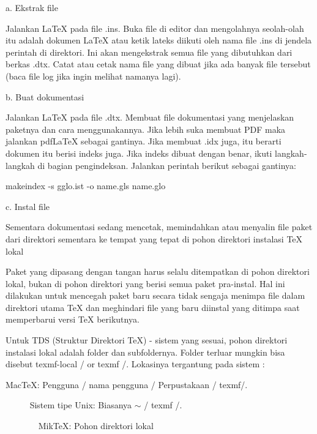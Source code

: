 \noindent a. Ekstrak file\par
Jalankan LaTeX pada file .ins. Buka file di editor dan mengolahnya seolah-olah itu adalah dokumen LaTeX atau ketik lateks diikuti oleh nama file .ins di jendela perintah di direktori. Ini akan mengekstrak semua file yang dibutuhkan dari berkas .dtx. Catat atau cetak nama file yang dibuat jika ada banyak file tersebut (baca file log jika ingin melihat namanya lagi). \par

\vspace{8pt}
\noindent b. Buat dokumentasi \par
Jalankan LaTeX pada file .dtx. Membuat file dokumentasi yang menjelaskan paketnya dan cara menggunakannya. Jika lebih suka membuat PDF maka jalankan pdfLaTeX sebagai gantinya. Jika membuat .idx juga, itu berarti dokumen itu berisi indeks juga. Jika indeks dibuat dengan benar, ikuti langkah-langkah di bagian pengindeksan. Jalankan perintah berikut sebagai gantinya: \par

makeindex -s gglo.ist -o name.gls name.glo \par

\vspace{40pt}
\noindent c. Instal file\par
Sementara dokumentasi sedang mencetak, memindahkan atau menyalin file paket dari direktori sementara ke tempat yang tepat di pohon direktori instalasi TeX lokal\par

Paket yang dipasang dengan tangan harus selalu ditempatkan di pohon direktori lokal, bukan di pohon direktori yang berisi semua paket pra-instal. Hal ini dilakukan untuk mencegah paket baru secara tidak sengaja menimpa file dalam direktori utama TeX dan meghindari file yang baru diinstal yang ditimpa saat memperbarui versi TeX berikutnya.\par

Untuk TDS (Struktur Direktori TeX) - sistem yang sesuai, pohon direktori instalasi lokal adalah folder dan subfoldernya. Folder terluar mungkin bisa disebut texmf-local / or texmf /. Lokasinya tergantung pada sistem :        

MacTeX: Pengguna / nama pengguna / Perpustakaan / texmf/. \par     
Sistem tipe Unix: Biasanya  $ \sim $  / texmf /. \par       
MikTeX: Pohon direktori lokal \par

